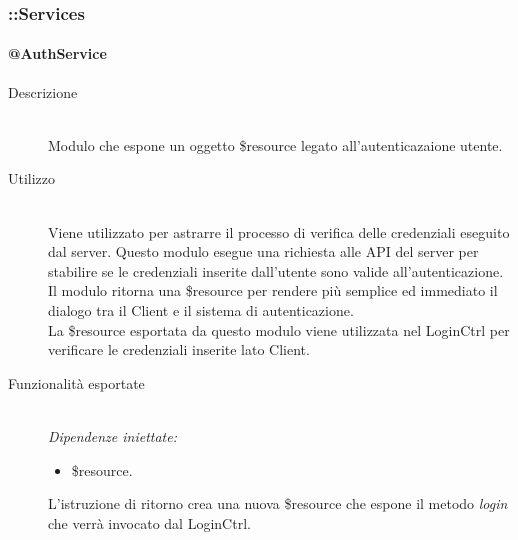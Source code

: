\subsubsection{::Services}
\paragraph{@AuthService}
\begin{description}
 \item[Descrizione] \hfill \\
 Modulo che espone un oggetto \$resource legato all'autenticazaione utente.
 \item[Utilizzo] \hfill \\
 Viene utilizzato per astrarre il processo di verifica delle credenziali eseguito dal server. Questo modulo esegue una richiesta alle
 API del server per stabilire se le credenziali inserite dall'utente sono valide all'autenticazione. Il modulo ritorna una \$resource
 per rendere più semplice ed immediato il dialogo tra il Client e il sistema di autenticazione. \\
 La \$resource esportata da questo modulo viene utilizzata nel LoginCtrl per verificare le credenziali inserite lato Client.
 \item[Funzionalità esportate] \hfill \\
 \emph{Dipendenze iniettate:}
 \begin{itemize}
  \item \$resource.
 \end{itemize}
 L'istruzione di ritorno crea una nuova \$resource che espone il metodo \textit{login} che verrà invocato dal LoginCtrl.
\end{description}


